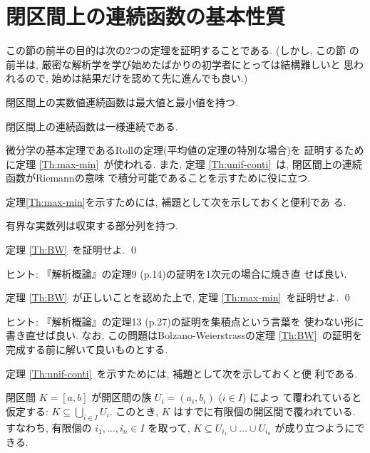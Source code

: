 \documentclass[12pt,twoside]{jarticle}
\begin{document}
\section{閉区間上の連続函数の基本性質}

この節の前半の目的は次の2つの定理を証明することである. (しかし, この節
の前半は, 厳密な解析学を学び始めたばかりの初学者にとっては結構難しいと
思われるので, 始めは結果だけを認めて先に進んでも良い.)

\begin{Theorem}\label{Th:max-min}
  閉区間上の実数値連続函数は最大値と最小値を持つ.
\end{Theorem}
%
\vspace{-\bigskipamount}
%
\begin{Theorem}\label{Th:unif-conti}
  閉区間上の連続函数は一様連続である.
\end{Theorem}

\noindent 微分学の基本定理であるRollの定理(平均値の定理の特別な場合)を
証明するために定理 \ref{Th:max-min}\ が使われる. 
また, 定理 \ref{Th:unif-conti}\ は, 閉区間上の連続函数がRiemannの意味
で積分可能であることを示すために役に立つ.

定理\ref{Th:max-min}を示すためには, 補題として次を示しておくと便利であ
る.

\begin{Theorem}\label{Th:BW}
  有界な実数列は収束する部分列を持つ.
\end{Theorem}

\begin{question}\qstar{*}
  定理 \ref{Th:BW}\ を証明せよ. \qed
\end{question}

\noindent ヒント: 『解析概論』の定理9 (p.14)の証明を1次元の場合に焼き直
せば良い.

\begin{question}\qstar{*}
  定理 \ref{Th:BW}\ が正しいことを認めた上で, 
  定理 \ref{Th:max-min}\ を証明せよ. 
  \qed
\end{question}

\noindent ヒント: 『解析概論』の定理13 (p.27)の証明を集積点という言葉を
使わない形に書き直せば良い. なお, この問題はBolzano-Weierstrassの定理 %
\ref{Th:BW}\ の証明を完成する前に解いて良いものとする.

定理 \ref{Th:unif-conti}\ を示すためには, 補題として次を示しておくと便
利である.

\begin{Theorem}\label{Th:HB}
  閉区間 $K = [a,b]$ が開区間の族 $U_i = (a_i, b_i)$ ($i\in I$) によっ
  て覆われていると仮定する: $K \subseteq \bigcup\limits_{i\in I} U_i$.
  このとき, $K$ はすでに有限個の開区間で覆われている. 
  すなわち, 有限個の $i_1,\dots,i_n\in I$ を取って, 
  $K \subseteq U_{i_1} \cup \dots \cup U_{i_n}$ が成り立つようにできる.
\end{Theorem}
\end{document}
